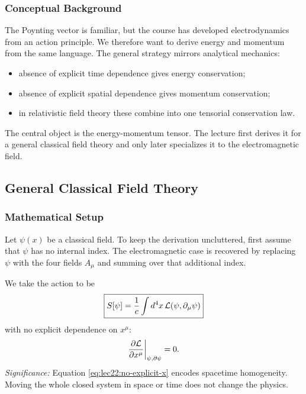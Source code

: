 \subsubsection*{Conceptual Background}
The Poynting vector is familiar, but the course has developed electrodynamics from an
action principle. We therefore want to derive energy and momentum from the same
language. The general strategy mirrors analytical mechanics:
\begin{itemize}
  \item absence of explicit time dependence gives energy conservation;
  \item absence of explicit spatial dependence gives momentum conservation;
  \item in relativistic field theory these combine into one tensorial conservation law.
\end{itemize}

The central object is the energy-momentum tensor. The lecture first derives it for a
general classical field theory and only later specializes it to the electromagnetic
field.

\subsection{General Classical Field Theory}
\label{subsec:lec22:general-action}

\subsubsection*{Mathematical Setup}
Let $\psi(x)$ be a classical field. To keep the derivation uncluttered, first assume
that $\psi$ has no internal index. The electromagnetic case is recovered by replacing
$\psi$ with the four fields $A_\mu$ and summing over that additional index.

We take the action to be
\begin{equation}\label{eq:lec22:general-action}
  \boxed{
  S[\psi]=\frac{1}{c}\int d^4x\,\mathcal{L}
  \qty(\psi,\partial_\mu\psi)}
\end{equation}
with no explicit dependence on $x^\mu$:
\begin{equation}\label{eq:lec22:no-explicit-x}
  \pdv{\mathcal{L}}{x^\mu}\bigg|_{\psi,\partial\psi}=0.
\end{equation}
\textit{Significance:} Equation \eqref{eq:lec22:no-explicit-x} encodes spacetime
homogeneity. Moving the whole closed system in space or time does not change the
physics.

